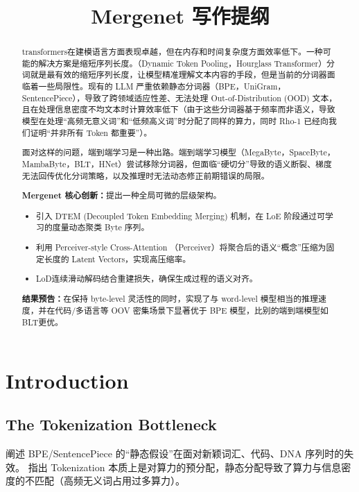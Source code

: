 \documentclass[a4paper,11pt]{ctexart}
\title{\textbf{Mergenet 写作提纲}}
\author{}
\date{}
\begin{document}
\maketitle

\begin{abstract}
transformers在建模语言方面表现卓越，但在内存和时间复杂度方面效率低下。一种可能的解决方案是缩短序列长度。（Dynamic Token Pooling，Hourglass Transformer）分词就是最有效的缩短序列长度，让模型精准理解文本内容的手段，但是当前的分词器面临着一些局限性。现有的 LLM 严重依赖静态分词器（BPE，UniGram，SentencePiece），导致了跨领域适应性差、无法处理 Out-of-Distribution (OOD) 文本，且在处理信息密度不均文本时计算效率低下（由于这些分词器基于频率而非语义，导致模型在处理“高频无意义词”和“低频高义词”时分配了同样的算力，同时 Rho-1 已经向我们证明“并非所有 Token 都重要”）。

面对这样的问题，端到端学习是一种出路。端到端学习模型（MegaByte，SpaceByte，MambaByte，BLT，HNet）尝试移除分词器，但面临“硬切分”导致的语义断裂、梯度无法回传优化分词策略，以及推理时无法动态修正前期错误的局限。

\textbf{Mergenet 核心创新：}提出一种全局可微的层级架构。
\begin{itemize}
    \item 引入 DTEM (Decoupled Token Embedding Merging) 机制，在 LoE 阶段通过可学习的度量动态聚类 Byte 序列。
    \item 利用 Perceiver-style Cross-Attention （Perceiver）将聚合后的语义“概念”压缩为固定长度的 Latent Vectors，实现高压缩率。
    \item LoD连续滑动解码结合重建损失，确保生成过程的语义对齐。
\end{itemize}

\textbf{结果预告：}在保持 byte-level 灵活性的同时，实现了与 word-level 模型相当的推理速度，并在代码/多语言等 OOV 密集场景下显著优于 BPE 模型，比别的端到端模型如BLT更优。
\end{abstract}

\section{Introduction}

\subsection{The Tokenization Bottleneck}
阐述 BPE/SentencePiece 的“静态假设”在面对新颖词汇、代码、DNA 序列时的失效。
指出 Tokenization 本质上是对算力的预分配，静态分配导致了算力与信息密度的不匹配（高频无义词占用过多算力）。
\end{document}
